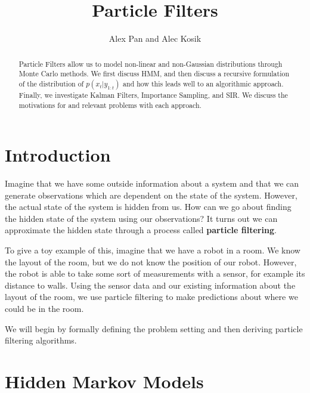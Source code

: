 \documentclass{article}
\title{\vspace{-2cm}Particle Filters} %
\author{Alex Pan and Alec Kosik}
\date{} %
\begin{document}
\maketitle

\begin{abstract}
Particle Filters allow us to model non-linear and non-Gaussian distributions through Monte Carlo methods. We first discuss HMM, and then discuss a recursive formulation of the distribution of $p(x_t|y_{1:t})$ and how this leads well to an algorithmic approach. Finally, we investigate Kalman Filters, Importance Sampling, and SIR. We discuss the motivations for and relevant problems with each approach.
\end{abstract}

\section{Introduction}

Imagine that we have some outside information about a system and that we can generate observations which are dependent on the state of the system. However, the actual state of the system is hidden from us. How can we go about finding the hidden state of the system using our observations? It turns out we can approximate the hidden state through a process called \textbf{particle filtering}.

To give a toy example of this, imagine that we have a robot in a room. We know the layout of the room, but we do not know the position of our robot. However, the robot is able to take some sort of measurements with a sensor, for example its distance to walls. Using the sensor data and our existing information about the layout of the room, we use particle filtering to make predictions about where we could be in the room.

We will begin by formally defining the problem setting and then deriving particle filtering algorithms.

\section{Hidden Markov Models}
\end{document}

